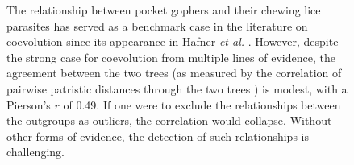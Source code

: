 \begin{figure}
    \centering
    \caption{The relationship between pocket gophers and their chewing lice parasites has served as a benchmark case in the literature on coevolution since its appearance in Hafner {\em et al.} \cite{hafner1994disparate}. However, despite the strong case for coevolution from multiple lines of evidence, the agreement between the two trees (as measured by the correlation of pairwise patristic distances through the two trees \cite{hommola2009permutation}) is modest, with a Pierson's $r$ of 0.49. If one were to exclude the relationships between the outgroups as outliers, the correlation would collapse. Without other forms of evidence, the detection of such relationships is challenging.}
    \label{fig:gopher-louse}
\end{figure}
